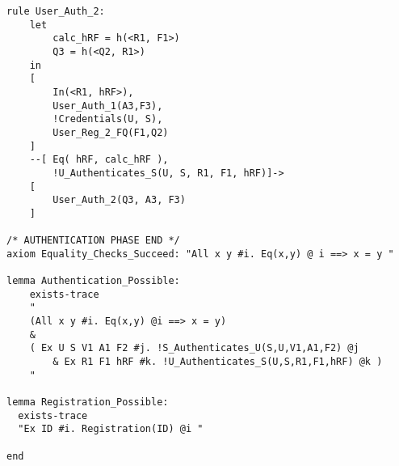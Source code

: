 \documentclass[a4paper, 12pt, titlepage]{article}
\begin{document}
\begin{lstlisting}[caption = Implementation of One Time Password Scheme \cite{github5}]
rule User_Auth_2:
	let
		calc_hRF = h(<R1, F1>)
		Q3 = h(<Q2, R1>)
	in
	[
		In(<R1, hRF>),
		User_Auth_1(A3,F3),
		!Credentials(U, S),
		User_Reg_2_FQ(F1,Q2)
	]
	--[ Eq( hRF, calc_hRF ),
		!U_Authenticates_S(U, S, R1, F1, hRF)]->
	[
		User_Auth_2(Q3, A3, F3)
	]

/* AUTHENTICATION PHASE END */
axiom Equality_Checks_Succeed: "All x y #i. Eq(x,y) @ i ==> x = y "

lemma Authentication_Possible:
	exists-trace
	"
	(All x y #i. Eq(x,y) @i ==> x = y)
	&
	( Ex U S V1 A1 F2 #j. !S_Authenticates_U(S,U,V1,A1,F2) @j
		& Ex R1 F1 hRF #k. !U_Authenticates_S(U,S,R1,F1,hRF) @k )
	"

lemma Registration_Possible:
  exists-trace
  "Ex ID #i. Registration(ID) @i "

end
\end{lstlisting}
\end{document}

